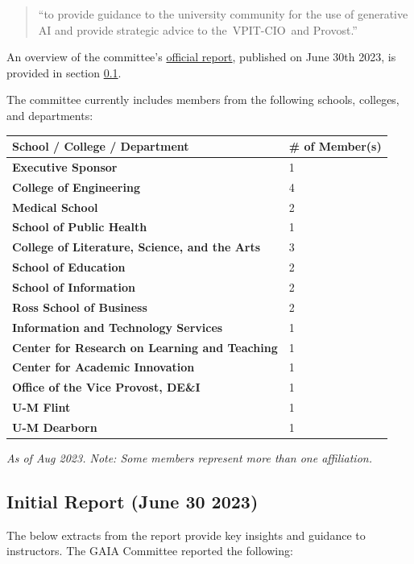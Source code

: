 \documentclass[
]{book}
\begin{document}
\begin{quote}
``to provide guidance to the university community for the use of generative AI and provide strategic advice to the~VPIT-CIO~and Provost.''
\end{quote}

An overview of the committee's \href{https://genai.umich.edu/committee-report}{official report}, published on June 30th 2023, is provided in section \ref{initial-report-june-30-2023}.

The committee currently includes members from the following schools, colleges, and departments:

\begin{longtable}[]{@{}ll@{}}
\toprule\noalign{}
School / College / Department & \# of Member(s) \\
\midrule\noalign{}
\endhead
\bottomrule\noalign{}
\endlastfoot
\textbf{Executive Sponsor} & 1 \\
\textbf{College of Engineering} & 4 \\
\textbf{Medical School} & 2 \\
\textbf{School of Public Health} & 1 \\
\textbf{College of Literature, Science, and the Arts} & 3 \\
\textbf{School of Education} & 2 \\
\textbf{School of Information} & 2 \\
\textbf{Ross School of Business} & 2 \\
\textbf{Information and Technology Services} & 1 \\
\textbf{Center for Research on Learning and Teaching} & 1 \\
\textbf{Center for Academic Innovation} & 1 \\
\textbf{Office of the Vice Provost, DE\&I} & 1 \\
\textbf{U-M Flint} & 1 \\
\textbf{U-M Dearborn} & 1 \\
\end{longtable}

\emph{As of Aug 2023. Note: Some members represent more than one affiliation.}

\hypertarget{initial-report-june-30-2023}{%
\subsection{Initial Report (June 30 2023)}\label{initial-report-june-30-2023}}

The below extracts from the report provide key insights and guidance to instructors. The GAIA Committee reported the following:
\end{document}
